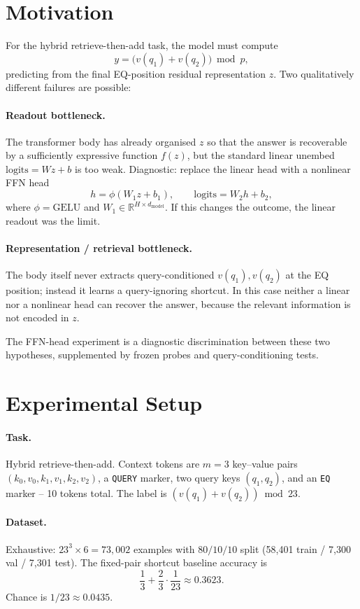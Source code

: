 \documentclass[10pt]{article}
\begin{document}
\section{Motivation}

For the hybrid retrieve-then-add task, the model must compute
\[
y = \bigl(v(q_1) + v(q_2)\bigr) \bmod p,
\]
predicting from the final EQ-position residual representation $z$. Two qualitatively different failures are possible:

\paragraph{Readout bottleneck.} The transformer body has already organised $z$ so that the answer is recoverable by a sufficiently expressive function $f(z)$, but the standard linear unembed $\mathrm{logits} = Wz + b$ is too weak. Diagnostic: replace the linear head with a nonlinear FFN head
\[
h = \phi(W_1 z + b_1), \qquad \mathrm{logits} = W_2 h + b_2,
\]
where $\phi = \mathrm{GELU}$ and $W_1 \in \mathbb{R}^{H \times d_\text{model}}$. If this changes the outcome, the linear readout was the limit.

\paragraph{Representation / retrieval bottleneck.} The body itself never extracts query-conditioned $v(q_1), v(q_2)$ at the EQ position; instead it learns a query-ignoring shortcut. In this case neither a linear nor a nonlinear head can recover the answer, because the relevant information is not encoded in $z$.

The FFN-head experiment is a diagnostic discrimination between these two hypotheses, supplemented by frozen probes and query-conditioning tests.

\section{Experimental Setup}

\paragraph{Task.}
Hybrid retrieve-then-add. Context tokens are $m=3$ key--value pairs $(k_0, v_0, k_1, v_1, k_2, v_2)$, a \texttt{QUERY} marker, two query keys $(q_1, q_2)$, and an \texttt{EQ} marker -- 10 tokens total. The label is $(v(q_1) + v(q_2)) \bmod 23$.

\paragraph{Dataset.}
Exhaustive: $23^3 \times 6 = 73{,}002$ examples with $80/10/10$ split (58{,}401 train / 7{,}300 val / 7{,}301 test). The fixed-pair shortcut baseline accuracy is
\[
\frac{1}{3} + \frac{2}{3}\cdot\frac{1}{23} \approx 0.3623.
\]
Chance is $1/23 \approx 0.0435$.
\end{document}
